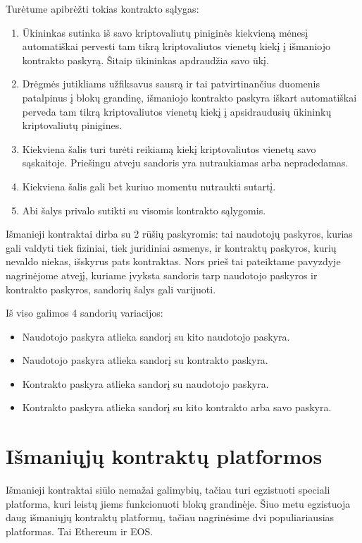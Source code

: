 \documentclass{VUMIFPSkursinis}
\begin{document}
Turėtume apibrėžti tokias kontrakto sąlygas: 
\begin{enumerate}
    \item Ūkininkas sutinka iš savo kriptovaliutų piniginės kiekvieną mėnesį automatiškai pervesti tam tikrą kriptovaliutos vienetų kiekį į išmaniojo kontrakto paskyrą. Šitaip ūkininkas apdraudžia savo ūkį.
    \item Drėgmės jutikliams užfiksavus sausrą ir tai patvirtinančius duomenis patalpinus į blokų grandinę, išmaniojo kontrakto paskyra iškart automatiškai perveda tam tikrą kriptovaliutos vienetų kiekį į apsidraudusių ūkininkų kriptovaliutų pinigines.
    \item Kiekviena šalis turi turėti reikiamą kiekį kriptovaliutos vienetų savo sąskaitoje. Priešingu atveju sandoris yra nutraukiamas arba nepradedamas.
    \item Kiekviena šalis gali bet kuriuo momentu nutraukti sutartį.
    \item Abi šalys privalo sutikti su visomis kontrakto sąlygomis.
\end{enumerate}

Išmanieji kontraktai dirba su 2 rūšių paskyromis: tai naudotojų paskyros, kurias gali valdyti tiek fiziniai, tiek juridiniai asmenys, ir kontraktų paskyros, kurių nevaldo niekas, išskyrus pats kontraktas. Nors prieš tai pateiktame pavyzdyje nagrinėjome atvejį, kuriame įvyksta sandoris tarp naudotojo paskyros ir kontrakto paskyros, sandorių šalys gali varijuoti. 

Iš viso galimos 4 sandorių variacijos:
\begin{itemize}
    \item Naudotojo paskyra atlieka sandorį su kito naudotojo paskyra.
    \item Naudotojo paskyra atlieka sandorį su kontrakto paskyra.
    \item Kontrakto paskyra atlieka sandorį su naudotojo paskyra.
    \item Kontrakto paskyra atlieka sandorį su kito kontrakto arba savo paskyra.
\end{itemize}

\section{Išmaniųjų kontraktų platformos}
Išmanieji kontraktai siūlo nemažai galimybių, tačiau turi egzistuoti speciali platforma, kuri leistų jiems funkcionuoti blokų grandinėje. Šiuo metu egzistuoja daug išmaniųjų kontraktų platformų, tačiau nagrinėsime dvi populiariausias platformas. Tai Ethereum ir EOS.
\end{document}
